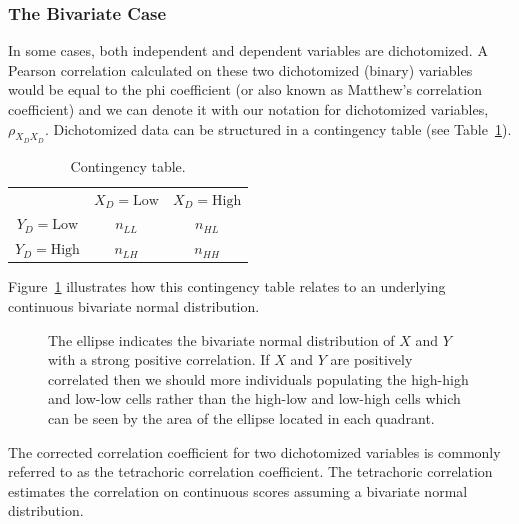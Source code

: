 \documentclass[
  letterpaper,
  DIV=11,
  numbers=noendperiod]{scrreprt}
\begin{document}
\subsubsection*{The Bivariate Case}\label{the-bivariate-case}

In some cases, both independent and dependent variables are
dichotomized. A Pearson correlation calculated on these two dichotomized
(binary) variables would be equal to the phi coefficient (or also known
as Matthew's correlation coefficient) and we can denote it with our
notation for dichotomized variables, \(\rho_{X_D X_D}\). Dichotomized
data can be structured in a contingency table (see
Table~\ref{tbl-biv-dich}).

\begin{longtable}[]{@{}ccc@{}}
\caption{Contingency table.}\label{tbl-biv-dich}\tabularnewline
\toprule\noalign{}
\endfirsthead
\endhead
\bottomrule\noalign{}
\endlastfoot
& \(X_D=\text{Low}\) & \(X_D=\text{High}\) \\
\(Y_D=\text{Low}\) & \(n_{LL}\) & \(n_{HL}\) \\
\(Y_D=\text{High}\) & \(n_{LH}\) & \(n_{HH}\) \\
\end{longtable}

Figure~\ref{fig-biv-dich} illustrates how this contingency table relates
to an underlying continuous bivariate normal distribution.

\begin{figure}[H]


\caption{\label{fig-biv-dich}The ellipse indicates the bivariate normal
distribution of \(X\) and \(Y\) with a strong positive correlation. If
\(X\) and \(Y\) are positively correlated then we should more
individuals populating the high-high and low-low cells rather than the
high-low and low-high cells which can be seen by the area of the ellipse
located in each quadrant.}

\end{figure}%

The corrected correlation coefficient for two dichotomized variables is
commonly referred to as the tetrachoric correlation coefficient. The
tetrachoric correlation estimates the correlation on continuous scores
assuming a bivariate normal distribution.
\end{document}
